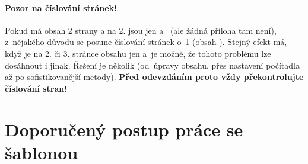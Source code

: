 \paragraph {Pozor na číslování stránek!} Pokud má obsah 2 strany a na 2. jsou jen  a~ (ale žádná příloha tam není), z~nějakého důvodu se posune číslování stránek o~1 (obsah ). Stejný efekt má, když je na 2. či 3. stránce obsahu jen  a~je možné, že tohoto problému lze dosáhnout i jinak. Řešení je několik (od~úpravy obsahu, přes nastavení počítadla až po sofistikovanější metody). \textbf{Před odevzdáním proto vždy překontrolujte číslování stran!}


\section*{Doporučený postup práce se šablonou}

